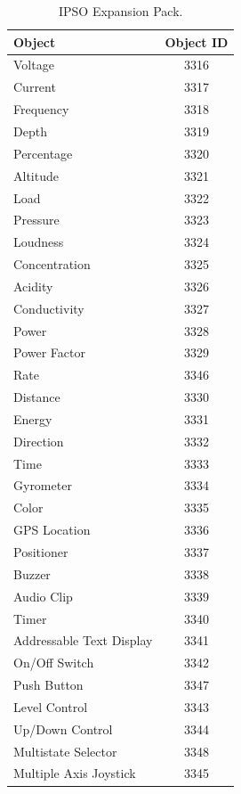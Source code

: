 \documentclass[peerreview, a4paper, 7pt]{IEEEtran}
\begin{document}
\begin{table}[!htbp]
\begin{center}
\caption{IPSO Expansion Pack.}
\begin{tabular}{|l|c|}
\hline
\textbf{Object} & \textbf{Object ID}  \\
\hline\hline
Voltage	& 3316 \\
\hline
Current	& 3317 \\
\hline
Frequency & 3318 \\
\hline
Depth & 3319 \\
\hline
Percentage & 3320 \\
\hline
Altitude & 3321 \\
\hline
Load & 3322 \\
\hline
Pressure & 3323 \\
\hline
Loudness & 3324 \\
\hline
Concentration & 3325 \\
\hline
Acidity	 & 3326 \\
\hline
Conductivity & 3327 \\
\hline
Power & 3328 \\
\hline
Power Factor & 3329 \\
\hline
Rate & 3346 \\
\hline
Distance & 3330 \\
\hline
Energy & 3331 \\
\hline
Direction & 3332 \\
\hline
Time & 3333 \\
\hline
Gyrometer & 3334 \\
\hline
Color & 3335 \\
\hline
GPS Location & 3336 \\
\hline
Positioner & 3337 \\
\hline
Buzzer & 3338 \\
\hline
Audio Clip & 3339 \\
\hline
Timer & 3340 \\
\hline
Addressable Text Display & 3341 \\
\hline
On/Off Switch & 3342 \\
\hline
Push Button & 3347 \\
\hline
Level Control & 3343 \\
\hline
Up/Down Control & 3344 \\
\hline
Multistate Selector & 3348 \\
\hline
Multiple Axis Joystick & 3345 \\
\hline 
\end{tabular}
\label{ipso-expansion-pack-table}
\end{center}
\end{table}
\end{document}

